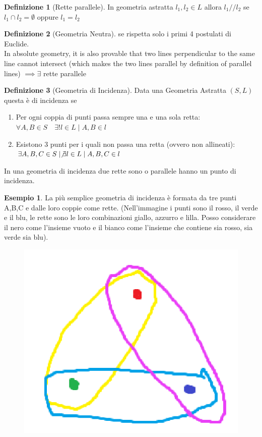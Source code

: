 \documentclass[a4paper,10pt]{article}
\theoremstyle{definition}
\theoremstyle{indentdefinition}
\newtheorem{defn}{Definizione}[section]
\theoremstyle{indentpostulate}
\theoremstyle{indenttheorem}
\theoremstyle{myremark}
\newtheorem{example*}{Esempio}
\theoremstyle{indentgeneral}
\begin{document}
\begin{defn}[Rette parallele] In geometria astratta
   $l_1,l_2\in L$ allora $l_1//l_2$ se $l_1\cap l_2=\emptyset$ oppure $l_1=l_2$
\end{defn}

\begin{defn}[Geometria Neutra]
 se rispetta solo i primi 4 postulati di Euclide.
 \\
 In absolute geometry, it is also provable that two lines perpendicular to the same line cannot intersect (which makes the two lines parallel by definition of parallel lines) $\implies\exists$ rette parallele
\end{defn}

\begin{defn}[Geometria di Incidenza]
    
Data una Geometria Astratta $(S,L)$ questa è di incidenza se
\begin{enumerate}
    \item Per ogni coppia di punti passa sempre una e una sola retta: $\forall A,B\in S \quad \exists ! l \in L\mid A,B \in l$
    \item Esistono 3 punti per i quali non passa una retta (ovvero non allineati): $\exists A,B,C \in S\mid  \not \exists l \in L \mid A,B,C \in l$
\end{enumerate}
In una geometria di incidenza due rette sono o parallele hanno un punto di incidenza.
\end{defn}


\begin{example*}
    La più semplice geometria di incidenza è formata da tre punti A,B,C e dalle loro coppie come rette. (Nell'immagine i punti sono il rosso, il verde e il blu, le rette sono le loro combinazioni giallo, azzurro e lilla. Posso considerare il nero come l'insieme vuoto e il bianco come l'insieme che contiene sia rosso, sia verde sia blu).
\end{example*}


\begin{figure} [H]
    \centering
    \includegraphics[scale=0.25]{Screenshot 2024-09-18 153852.png}
\end{figure}
\end{document}
